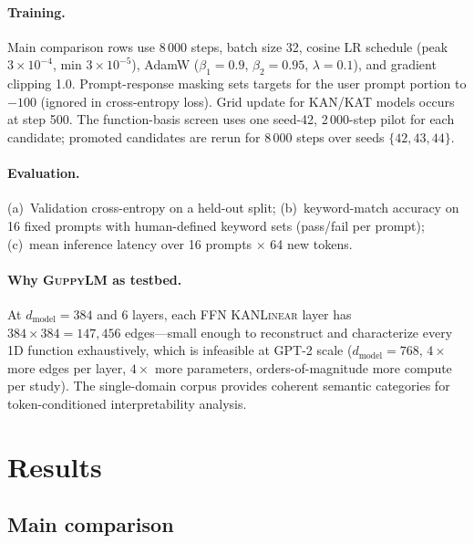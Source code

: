 \documentclass{article}
\newcommand{\guppylm}{\textsc{GuppyLM}}
\newcommand{\kanlinear}{\textsc{KANLinear}}
\begin{document}
\paragraph{Training.}
Main comparison rows use 8\,000 steps, batch size 32, cosine LR schedule
(peak $3\times10^{-4}$, min $3\times10^{-5}$), AdamW
($\beta_1=0.9$, $\beta_2=0.95$, $\lambda=0.1$), and gradient clipping 1.0.
Prompt-response masking sets targets for the user prompt portion to $-100$
(ignored in cross-entropy loss).
Grid update for KAN/KAT models occurs at step 500.
The function-basis screen uses one seed-42, 2\,000-step pilot for each
candidate; promoted candidates are rerun for 8\,000 steps over seeds
$\{42,43,44\}$.

\paragraph{Evaluation.}
(a)~Validation cross-entropy on a held-out split;
(b)~keyword-match accuracy on 16 fixed prompts with human-defined keyword
sets (pass/fail per prompt);
(c)~mean inference latency over 16 prompts $\times$ 64 new tokens.

\paragraph{Why \guppylm{} as testbed.}
At $d_\text{model}=384$ and 6 layers, each FFN \kanlinear{} layer has
$384\!\times\!384=147{,}456$ edges---small enough to reconstruct and
characterize every 1D function exhaustively, which is infeasible at GPT-2
scale ($d_\text{model}=768$, $4\times$ more edges per layer, $4\times$ more
parameters, orders-of-magnitude more compute per study).
The single-domain corpus provides coherent semantic categories for
token-conditioned interpretability analysis.

\section{Results}
\label{sec:results}

\subsection{Main comparison}
\end{document}
